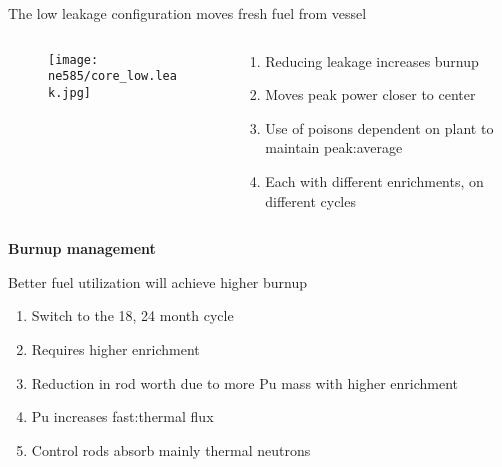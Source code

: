 \documentclass[aspectratio=1610,pdftex,dvipsnames,compress,xcolor={dvipsnames}]{beamer}
\begin{document}
\begin{frame}{The low leakage configuration moves fresh fuel from vessel}
    \begin{columns}

        \begin{column}{0.55\textwidth}
            \begin{figure}
                \centering
                \texttt{[image: ne585/core\_low.leak.jpg]}
            \end{figure}
        \end{column}

        \begin{column}{0.45\textwidth}
            \begin{enumerate}[series=outerlist,topsep=0pt,itemsep=15pt,leftmargin=*,label=(\arabic*)]
                \item[]Reducing leakage increases burnup
                \item[]Moves peak power closer to center
                \item[]Use of poisons dependent on plant to maintain peak:average
                \item[]Each with different enrichments, on different cycles
            \end{enumerate}
        \end{column}

    \end{columns}
\end{frame}


\begin{frame}[plain]{}
    \centering\LARGE\textbf{Burnup management}
\end{frame}


\addtocounter{framenumber}{-1} 
\begin{frame}{Better fuel utilization will achieve higher burnup}
    \begin{enumerate}[series=blue,topsep=0pt,itemsep=21pt,leftmargin=*,label=(\arabic*)]
        \item[]Switch to the 18, 24 month cycle
        \item[]Requires higher enrichment
        \item[]Reduction in rod worth due to more Pu mass with higher enrichment
        \item[]Pu increases fast:thermal flux
        \item[]Control rods absorb mainly thermal neutrons
    \end{enumerate}
\end{frame}
\end{document}
